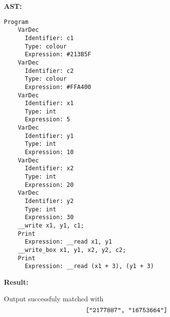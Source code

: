 \textbf{AST:}

{
    \lstset{xleftmargin=0.2\textwidth}

    \begin{lstlisting}
Program
    VarDec
      Identifier: c1
      Type: colour
      Expression: #213B5F
    VarDec
      Identifier: c2
      Type: colour
      Expression: #FFA400
    VarDec
      Identifier: x1
      Type: int
      Expression: 5
    VarDec
      Identifier: y1
      Type: int
      Expression: 10
    VarDec
      Identifier: x2
      Type: int
      Expression: 20
    VarDec
      Identifier: y2
      Type: int
      Expression: 30
    __write x1, y1, c1;
    Print
      Expression: __read x1, y1
    __write_box x1, y1, x2, y2, c2;
    Print
      Expression: __read (x1 + 3), (y1 + 3)
\end{lstlisting}

}

\textbf{Result:}

Output successfuly matched with $$\texttt{["2177887", "16753664"]}$$

\newpage
